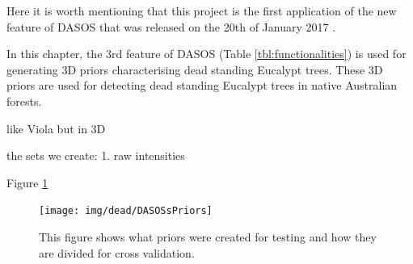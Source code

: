 \documentclass{subfiles}
\begin{document}
\par Here it is worth mentioning that this project is the first application of the new feature of DASOS that was released on the 20th of January 2017 \cite{DASOS_v2}. 

\par In this chapter, the 3rd feature of DASOS (Table \ref{tbl:functionalities}) is used for generating 3D priors characterising dead standing Eucalypt trees. These 3D priors are used for detecting dead standing Eucalypt trees in native Australian forests. 


\par like Viola but in 3D 

\par the sets we create: 1. raw intensities 

\par Figure \ref{fig:DASOSsPriors}


 \begin{figure} [h!]
	\centering
	\texttt{[image: img/dead/DASOSsPriors]}
	\caption{This figure shows what priors were created for testing and how they are divided for cross validation.}
	\label{fig:DASOSsPriors}
\end{figure}
\end{document}
